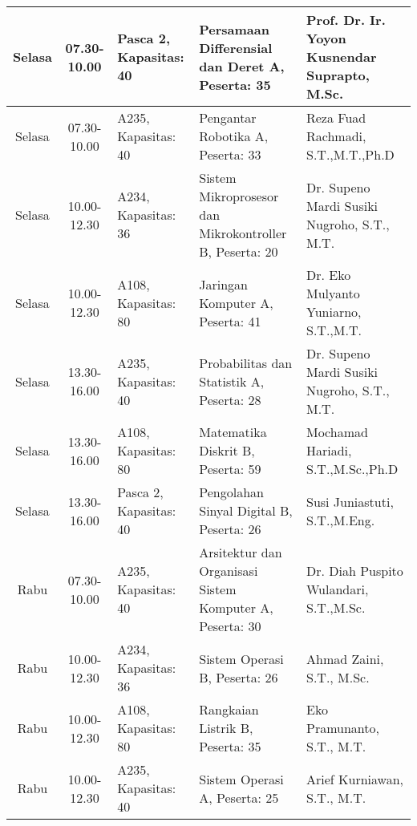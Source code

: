 \begin{longtable}[c]{|c|c|>{\centering\arraybackslash}m{2.5cm}|>{\centering\arraybackslash}m{4cm}|>{\centering\arraybackslash}m{3.2cm}|}
  Selasa & 07.30-10.00 & Pasca 2, Kapasitas: 40 & Persamaan Differensial dan Deret A, \linebreak Peserta: 35          & Prof. Dr. Ir. Yoyon Kusnendar Suprapto, M.Sc. \\ \hline
  Selasa & 07.30-10.00 & A235, Kapasitas: 40    & Pengantar Robotika A, \linebreak Peserta: 33                        & Reza Fuad Rachmadi, S.T.,M.T.,Ph.D            \\ \hline
  Selasa & 10.00-12.30 & A234, Kapasitas: 36    & Sistem Mikroprosesor dan Mikrokontroller B, \linebreak Peserta: 20  & Dr. Supeno Mardi Susiki Nugroho, S.T., M.T.   \\ \hline
  Selasa & 10.00-12.30 & A108, Kapasitas: 80    & Jaringan Komputer A, \linebreak Peserta: 41                         & Dr. Eko Mulyanto Yuniarno, S.T.,M.T.          \\ \hline
  Selasa & 13.30-16.00 & A235, Kapasitas: 40    & Probabilitas dan Statistik A, \linebreak Peserta: 28                & Dr. Supeno Mardi Susiki Nugroho, S.T., M.T.   \\ \hline
  Selasa & 13.30-16.00 & A108, Kapasitas: 80    & Matematika Diskrit B, \linebreak Peserta: 59                        & Mochamad Hariadi, S.T.,M.Sc.,Ph.D             \\ \hline
  Selasa & 13.30-16.00 & Pasca 2, Kapasitas: 40 & Pengolahan Sinyal Digital B, \linebreak Peserta: 26                 & Susi Juniastuti, S.T.,M.Eng.                  \\ \hline
  Rabu   & 07.30-10.00 & A235, Kapasitas: 40    & Arsitektur dan Organisasi Sistem Komputer A, \linebreak Peserta: 30 & Dr. Diah Puspito Wulandari, S.T.,M.Sc.        \\ \hline
  Rabu   & 10.00-12.30 & A234, Kapasitas: 36    & Sistem Operasi B, \linebreak Peserta: 26                            & Ahmad Zaini, S.T., M.Sc.                      \\ \hline
  Rabu   & 10.00-12.30 & A108, Kapasitas: 80    & Rangkaian Listrik B, \linebreak Peserta: 35                         & Eko Pramunanto, S.T., M.T.                    \\ \hline
  Rabu   & 10.00-12.30 & A235, Kapasitas: 40    & Sistem Operasi A, \linebreak Peserta: 25                            & Arief Kurniawan, S.T., M.T.                   \\ \hline

\end{longtable}
